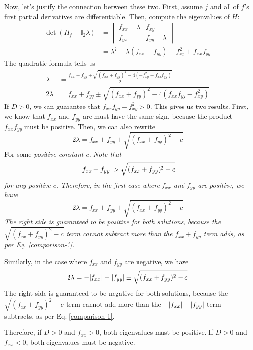 Now, let's justify the connection between these two. First, assume \(f\) and all of \(f\)'s first partial derivatives are differentiable. Then, compute the eigenvalues of \(H\):
\begin{align*}
    \det (H_f - \mathbb{I}_2\lambda) &= \begin{vmatrix}
        f_{xx} - \lambda & f_{xy} \\
        f_{yx} & f_{yy} - \lambda
    \end{vmatrix} \\
    &= \lambda^2 - \lambda (f_{xx} + f_{yy}) - f_{xy}^2 + f_{xx}f_{yy}
\end{align*}
The quadratic formula tells us 
\begin{align*}
    \lambda &= \frac{f_{xx}+f_{yy}\pm \sqrt{(f_{xx}+f_{yy})^2-4(-f_{xy}^2+f_{xx}f_{yy})}}{2} \\
    2\lambda &= f_{xx}+f_{yy} \pm \sqrt{(f_{xx}+f_{yy})^2-4(f_{xx}f_{yy}-f_{xy}^2)}
\end{align*}    
If \(D>0\), we can guarantee that \(f_{xx}f_{yy} - f_{xy}^2 > 0\). This gives us two results. First, we know that \(f_{xx}\) and \(f_{yy}\) are must have the same sign, because the product \(f_{xx}f_{yy}\) must be positive. Then, we can also rewrite
\[ 2\lambda = f_{xx} + f_{yy} \pm \sqrt{(f_{xx}+f_{yy})^2-c} \]
For some \it{positive} constant \(c\). Note that
\begin{equation}\label{comparison-1}
    \abs{f_{xx}+f_{yy}} > \sqrt{(f_{xx}+f_{yy})^2-c}
\end{equation}
for any positive \(c\). Therefore, in the first case where \(f_{xx}\) and \(f_{yy}\) are positive, 
we have 
\[ 2\lambda = f_{xx} + f_{yy} \pm \sqrt{(f_{xx}+f_{yy})^2-c} \]
The right side is guaranteed to be positive for both solutions, because the \(\sqrt{(f_{xx}+f_{yy})^2-c}\) term cannot subtract more than the \(f_{xx}+f_{yy}\) term adds, as per Eq. \ref{comparison-1}. \par
Similarly, in the case where \(f_{xx}\) and \(f_{yy}\) are negative, we have
\[ 2\lambda = -\abs{f_{xx}} - \abs{f_{yy}} \pm \sqrt{(f_{xx}+f_{yy})^2-c}\]
The right side is guaranteed to be negative for both solutions, because the \(\sqrt{(f_{xx}+f_{yy})^2-c}\) term cannot add more than the \(-\abs{f_{xx}}-\abs{f_{yy}}\) term subtracts, as per Eq. \ref{comparison-1}.\par
Therefore, if \(D>0\) and \(f_{xx} > 0\), both eigenvalues must be positive. If \(D>0\) and \(f_{xx} < 0\), both eigenvalues must be negative.
